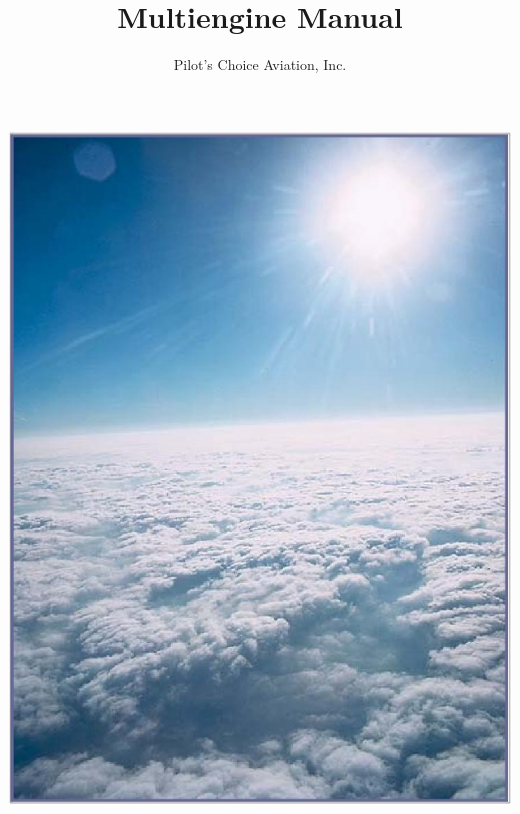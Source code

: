 \documentclass[11pt,twoside,letterpaper,onecolumn]{book}
\author{Pilot's Choice Aviation, Inc.}
\title{Multiengine Manual}
\begin{document}


\begin{titlepage} %

\begin{center}
\includegraphics[width=1.0\linewidth]{blue-sky}
\end{center}


\end{titlepage}

\thispagestyle{empty}
\end{document}
